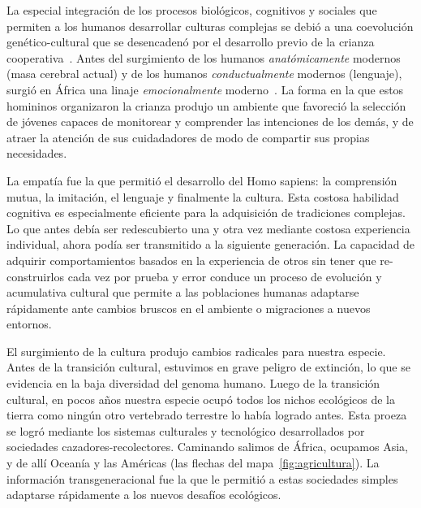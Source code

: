 \documentclass[a4paper,10pt]{book}
\begin{document}
La especial integraci\'on de los procesos biol\'ogicos, cognitivos y sociales que permiten a los humanos desarrollar culturas complejas se debió a una coevolución genético-cultural que se desencadenó por el desarrollo previo de la crianza cooperativa~\cite{hrdy2020-emotionallyModern}.
Antes del surgimiento de los humanos \emph{anatómicamente} modernos (masa cerebral actual) y de los humanos \emph{conductualmente} modernos (lenguaje), surgió en África una linaje \emph{emocionalmente} moderno~\cite{hrdy2020-emotionallyModern}.
La forma en la que estos homininos organizaron la crianza produjo un ambiente que favoreció la selección de jóvenes capaces de monitorear y comprender las intenciones de los demás, y de atraer la atención de sus cuidadadores de modo de compartir sus propias necesidades.


La empatía fue la que permitió el desarrollo del Homo sapiens: la comprensión mutua, la imitación, el lenguaje y finalmente la cultura.
Esta costosa habilidad cognitiva es especialmente eficiente para la adquisición de tradiciones complejas.
Lo que antes debía ser redescubierto una y otra vez mediante costosa experiencia individual, ahora podía ser transmitido a la siguiente generación.
La capacidad de adquirir comportamientos basados en la experiencia de otros sin tener que re-construirlos cada vez por prueba y error conduce un proceso de evolución y acumulativa cultural que permite a las poblaciones humanas adaptarse rápidamente ante cambios bruscos en el ambiente o migraciones a nuevos entornos.


El surgimiento de la cultura produjo cambios radicales para nuestra especie.
Antes de la transición cultural, estuvimos en grave peligro de extinción, lo que se evidencia en la baja diversidad del genoma humano.
Luego de la transición cultural, en pocos años nuestra especie ocupó todos los nichos ecológicos de la tierra como ningún otro vertebrado terrestre lo había logrado antes.
Esta proeza se logró mediante los sistemas culturales y tecnológico desarrollados por sociedades cazadores-recolectores.
Caminando salimos de África, ocupamos Asia, y de allí Oceanía y las Américas (las flechas del mapa~\ref{fig:agricultura}).
La información transgeneracional fue la que le permitió a estas sociedades simples adaptarse rápidamente a los nuevos desafíos ecológicos.

\end{document}
